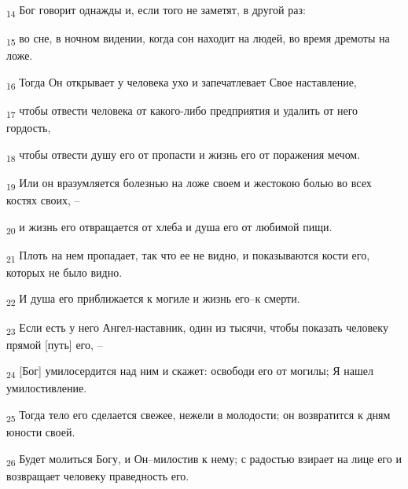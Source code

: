 \begin{tcolorbox}
\textsubscript{14} Бог говорит однажды и, если того не заметят, в другой раз:
\end{tcolorbox}
\begin{tcolorbox}
\textsubscript{15} во сне, в ночном видении, когда сон находит на людей, во время дремоты на ложе.
\end{tcolorbox}
\begin{tcolorbox}
\textsubscript{16} Тогда Он открывает у человека ухо и запечатлевает Свое наставление,
\end{tcolorbox}
\begin{tcolorbox}
\textsubscript{17} чтобы отвести человека от какого-либо предприятия и удалить от него гордость,
\end{tcolorbox}
\begin{tcolorbox}
\textsubscript{18} чтобы отвести душу его от пропасти и жизнь его от поражения мечом.
\end{tcolorbox}
\begin{tcolorbox}
\textsubscript{19} Или он вразумляется болезнью на ложе своем и жестокою болью во всех костях своих, --
\end{tcolorbox}
\begin{tcolorbox}
\textsubscript{20} и жизнь его отвращается от хлеба и душа его от любимой пищи.
\end{tcolorbox}
\begin{tcolorbox}
\textsubscript{21} Плоть на нем пропадает, так что ее не видно, и показываются кости его, которых не было видно.
\end{tcolorbox}
\begin{tcolorbox}
\textsubscript{22} И душа его приближается к могиле и жизнь его--к смерти.
\end{tcolorbox}
\begin{tcolorbox}
\textsubscript{23} Если есть у него Ангел-наставник, один из тысячи, чтобы показать человеку прямой [путь] его, --
\end{tcolorbox}
\begin{tcolorbox}
\textsubscript{24} [Бог] умилосердится над ним и скажет: освободи его от могилы; Я нашел умилостивление.
\end{tcolorbox}
\begin{tcolorbox}
\textsubscript{25} Тогда тело его сделается свежее, нежели в молодости; он возвратится к дням юности своей.
\end{tcolorbox}
\begin{tcolorbox}
\textsubscript{26} Будет молиться Богу, и Он--милостив к нему; с радостью взирает на лице его и возвращает человеку праведность его.
\end{tcolorbox}
